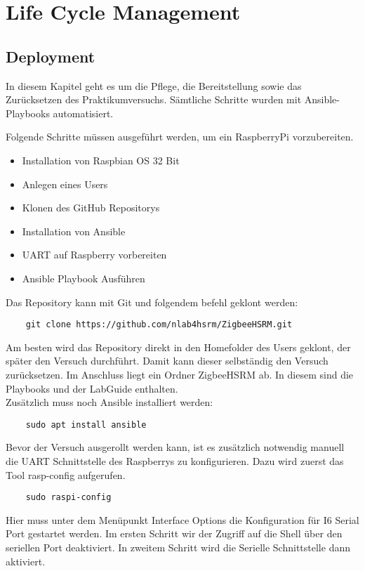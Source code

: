 \chapter{Life Cycle Management}
\section{Deployment}
In diesem Kapitel geht es um die Pflege, die Bereitstellung sowie das Zurücksetzen des Praktikumversuchs. Sämtliche Schritte wurden mit Ansible-Playbooks
automatisiert.

Folgende Schritte müssen ausgeführt werden, um ein RaspberryPi vorzubereiten.
\begin{itemize}
    \item Installation von Raspbian OS 32 Bit
    \item Anlegen eines Users
    \item Klonen des GitHub Repositorys 
    \item Installation von Ansible
    \item UART auf Raspberry vorbereiten
    \item Ansible Playbook Ausführen
\end{itemize}

Das Repository kann mit Git und folgendem befehl geklont werden:
\begin{lstlisting}
    git clone https://github.com/nlab4hsrm/ZigbeeHSRM.git
\end{lstlisting}
Am besten wird das Repository direkt in den Homefolder des Users geklont, der später den Versuch durchführt. Damit kann dieser selbständig den Versuch zurücksetzen. Im Anschluss liegt ein Ordner
\grqq ZigbeeHSRM\grqq{} ab. In diesem sind die Playbooks und der LabGuide enthalten.\\
Zusätzlich muss noch Ansible installiert werden:
\begin{lstlisting}
    sudo apt install ansible
\end{lstlisting}

Bevor der Versuch ausgerollt werden kann, ist es zusätzlich notwendig manuell die UART Schnittstelle des Raspberrys zu konfigurieren. Dazu wird zuerst das Tool rasp-config aufgerufen.
\begin{lstlisting}
    sudo raspi-config
\end{lstlisting}
Hier muss unter dem Menüpunkt  Interface Options\grqq{} die Konfiguration für \grqq I6 Serial Port\grqq{} gestartet werden. Im ersten Schritt wir der Zugriff auf die Shell über den seriellen
Port deaktiviert. In zweitem Schritt wird die Serielle Schnittstelle dann aktiviert. 

